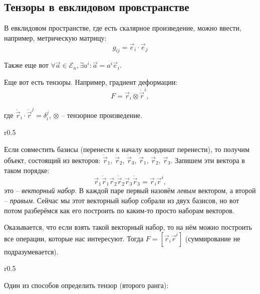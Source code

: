 \subsection{Тензоры в евклидовом провстранстве}

В евклидовом пространстве, где есть скалярное произведение, можно ввести, например, метрическую
матрицу:
\[
  g_{ij} = \vec{e}_i \cdot \vec{e}_j
\]

Также еще вот $\forall \vec{a} \in \mathcal{E}_n, \exists a^i :  \vec{a} = a^i \vec{e}_i$.

Еще вот есть тензоры. Например, градиент деформации:
\[
  F = \vec{r}_i \otimes \mathring{\vec{r}}^i,
\]

\begin{figure}[H]
	\centering
	
\end{figure}
где $\mathring{\vec{r}}_i \cdot \mathring{\vec{r}}^j = \delta_i^j$,
  $\otimes$ -- тензорное произведение.
  

\begin{wrapfigure}{r}{0.5\textwidth}
	\centering
	
\end{wrapfigure}

Если совместить базисы (перенести к началу координат перенести), то получим объект, состоящий
из векторов: $\mathring{\vec{r}}_1$, $\mathring{\vec{r}}_2$, $\mathring{\vec{r}}_3$, $\vec{r}_1$,
$\vec{r}_2$, $\vec{r}_3$. Запишем эти вектора в таком порядке:
\[
  \vec{r}_1 \mathring{\vec{r}}_1 \vec{r}_2 \mathring{\vec{r}}_2 \vec{r}_3 \mathring{\vec{r}}_3 = \vec{r}_i \vec{r}^i,
\]
это -- \emph{векторный набор}. В каждой паре первый назовём \emph{левым} вектором, а
второй -- \emph{правым}. Сейчас мы этот векторный набор собрали из двух базисов, но вот потом
разберёмся как его построить по каким-то просто наборам векторов. 

%	

Оказывается, что если взять такой векторный набор, то на нём можно построить все операции, которые
нас интересуют. Тогда $F = [\vec{r}_i \vec{r}^i]$ (суммирование не подразумевается).

\begin{wrapfigure}{r}{0.5\textwidth}
	\centering
	
\end{wrapfigure}

Один из способов определить тензор (второго ранга):

